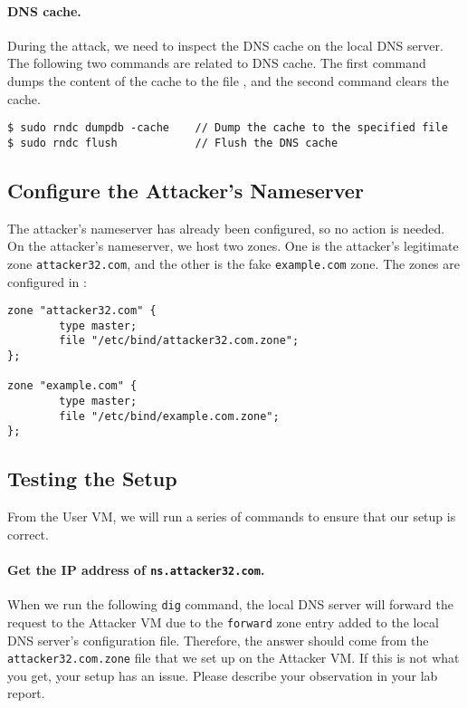 \paragraph{DNS cache.}
During the attack, we need to inspect the DNS cache on the local DNS server.
The following two commands are related to DNS cache.
The first command dumps the content of the cache to the file 
, 
and the second command clears the cache.

\begin{lstlisting}
$ sudo rndc dumpdb -cache    // Dump the cache to the specified file
$ sudo rndc flush            // Flush the DNS cache
\end{lstlisting}


\subsection{Configure the Attacker's Nameserver}


The attacker's nameserver has already been configured, 
so no action is needed. 
On the attacker's nameserver, we host two zones. One is 
the attacker's legitimate zone \texttt{attacker32.com}, and the other 
is the fake \texttt{example.com} zone. The zones are 
configured in :

\begin{lstlisting}
zone "attacker32.com" {
        type master;
        file "/etc/bind/attacker32.com.zone";
};

zone "example.com" {
        type master;
        file "/etc/bind/example.com.zone";
};
\end{lstlisting}



\subsection{Testing the Setup}

From the User VM, we will run a series of commands to ensure 
that our setup is correct. 


\paragraph{Get the IP address of \texttt{ns.attacker32.com}.}
When we run the following \texttt{dig} command, 
the local DNS server will forward the request to the Attacker VM 
due to the \texttt{forward} zone entry added to the local DNS server's
configuration file. Therefore, the answer should come from
the \texttt{attacker32.com.zone} file that we set up on the Attacker VM.
If this is not what you get, your setup has an issue. Please describe your
observation in your lab report. 

